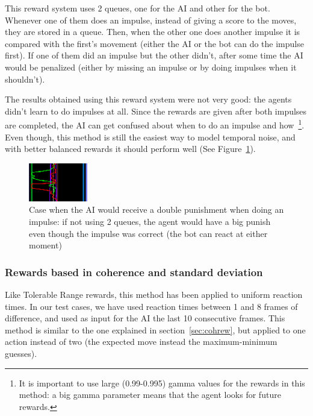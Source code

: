 This reward system uses 2 queues, one for the AI and other for the bot. Whenever one of them does an impulse, instead of giving a score to the moves, they are stored in a queue. Then, when the other one does another impulse it is compared with the first's movement (either the AI or the bot can do the impulse first). If one of them did an impulse but the other didn't, after some time the AI would be penalized (either by missing an impulse or by doing impulses when it shouldn't).

The results obtained using this reward system were not very good: the agents didn't learn to do impulses at all. Since the rewards are given after both impulses are completed, the AI can get confused about when to do an impulse and how~\footnote{It is important to use large (0.99-0.995) gamma values for the rewards in this method: a big gamma parameter means that the agent looks for future rewards.}. Even though, this method is still the easiest way to model temporal noise, and with better balanced rewards it should perform well (See Figure~\ref{fig:punDelay}).

\begin{figure}[h]
  \centering
		\includegraphics[width=.3\textwidth]{img/punDelay.png}
  \caption{Case when the AI would receive a double punishment when doing an impulse: if not using 2 queues, the agent would have a big punish even though the impulse was correct (the bot can react at either moment)}
  \label{fig:punDelay}
\end{figure}

\subsubsection{Rewards based in coherence and standard deviation}
\label{sec:rewchstd}

Like Tolerable Range rewards, this method has been applied to uniform reaction times. In our test cases, we have used reaction times between 1 and 8 frames of difference, and used as input for the AI the last 10 consecutive frames. This method is similar to the one explained in section~\ref{sec:cohrew}, but applied to one action instead of two (the expected move instead the maximum-minimum guesses).


